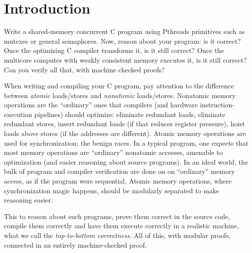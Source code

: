 
\chapter{Introduction\label{ch:intro}}

Write a shared-memory concurrent C program using Pthreads primitives such as mutexes or general semaphores. 
Now, reason about your program: is it correct? 
Once the optimizing C compiler transforms it, is it still correct? 
Once the multicore computer with weakly consistent memory executes it, is it still correct? 
Can you verify all that, with machine checked proofs?



When writing and compiling your C program, pay attention to
the difference between \emph{atomic} loads/stores
and \emph{nonatomic} loads/stores.  Nonatomic memory
operations are the ``ordinary'' ones that compilers
(and hardware instruction-execution pipelines)
should optimize:
eliminate redundant loads, eliminate redundant stores,
insert redundant loads (if that reduces register pressure),
hoist loads above stores (if the addresses are different).
Atomic memory operations are used for synchronization; the benign races.  In a typical
program, one expects that most memory operations are ``ordinary''
nonatomic accesses, amenable to optimization (and easier
reasoning about source programs). In an ideal world, the bulk of program and compiler
verification are done on on ``ordinary'' memory access, as if the program were sequential. 
Atomic memory operations, where synchronization magic happens, should be 
modularly separated to make reasoning easier.

This  to reason about such programs, 
prove them correct  in the source code, compile them correctly and
have them execute correctly in a realistic machine, what we call the 
\emph{top-to-bottom correctness}. All of this, with modular proofs, connected in an entirely
machine-checked proof.  

